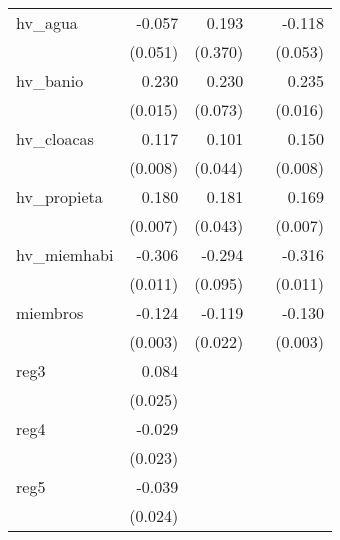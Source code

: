 {\begin{longtable}{l*{4}{D{.}{.}{-1}}}
\addlinespace
hv\_agua     &      -0.057         &       0.193         &                     &      -0.118\sym{*}  \\
            &     (0.051)         &     (0.370)         &                     &     (0.053)         \\
\addlinespace
hv\_banio    &       0.230\sym{***}&       0.230\sym{**} &                     &       0.235\sym{***}\\
            &     (0.015)         &     (0.073)         &                     &     (0.016)         \\
\addlinespace
hv\_cloacas  &       0.117\sym{***}&       0.101\sym{*}  &                     &       0.150\sym{***}\\
            &     (0.008)         &     (0.044)         &                     &     (0.008)         \\
\addlinespace
hv\_propieta &       0.180\sym{***}&       0.181\sym{***}&                     &       0.169\sym{***}\\
            &     (0.007)         &     (0.043)         &                     &     (0.007)         \\
\addlinespace
hv\_miemhabi &      -0.306\sym{***}&      -0.294\sym{**} &                     &      -0.316\sym{***}\\
            &     (0.011)         &     (0.095)         &                     &     (0.011)         \\
\addlinespace
miembros    &      -0.124\sym{***}&      -0.119\sym{***}&                     &      -0.130\sym{***}\\
            &     (0.003)         &     (0.022)         &                     &     (0.003)         \\
\addlinespace
reg3        &       0.084\sym{***}&                     &                     &                     \\
            &     (0.025)         &                     &                     &                     \\
\addlinespace
reg4        &      -0.029         &                     &                     &                     \\
            &     (0.023)         &                     &                     &                     \\
\addlinespace
reg5        &      -0.039         &                     &                     &                     \\
            &     (0.024)         &                     &                     &                     \\

\end{longtable}}
